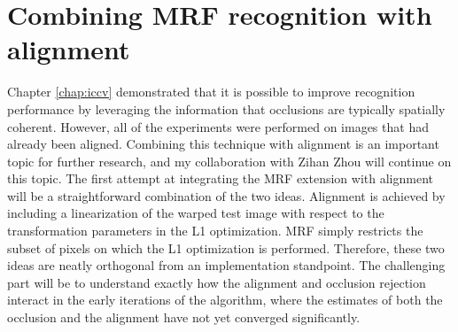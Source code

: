 

\section{Combining MRF recognition with alignment} Chapter \ref{chap:iccv} demonstrated that it is possible to improve recognition performance by leveraging the information that occlusions are typically spatially coherent.  However, all of the experiments were performed on images that had already been aligned.  Combining this technique with alignment is an important topic for further research, and my collaboration with Zihan Zhou will continue on this topic.  The first attempt at integrating the MRF extension with alignment will be a straightforward combination of the two ideas.  Alignment is achieved by including a linearization of the warped test image with respect to the transformation parameters in the L1 optimization.  MRF simply restricts the subset of pixels on which the L1 optimization is performed.  Therefore, these two ideas are neatly orthogonal from an implementation standpoint.  The challenging part will be to understand exactly how the alignment and occlusion rejection interact in the early iterations of the algorithm, where the estimates of both the occlusion and the alignment have not yet converged significantly.


